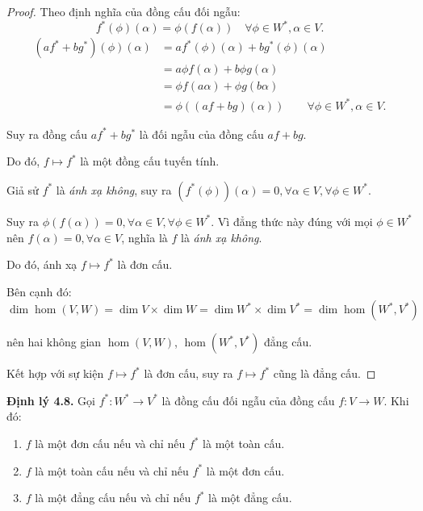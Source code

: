 \documentclass[class=linearalgebra,crop=false]{standalone}
\begin{document}
\begin{proof}
    Theo định nghĩa của đồng cấu đối ngẫu:
    \[
        f^{*}(\phi)(\alpha) = \phi(f(\alpha))\quad\forall\phi\in W^{*},\alpha\in V.
    \]
    \begin{align*}
        (af^{*}+bg^{*})(\phi)(\alpha) & = af^{*}(\phi)(\alpha) + bg^{*}(\phi)(\alpha) \\
                                      & = a\phi f(\alpha) + b\phi g(\alpha) \\
                                      & = \phi f(a\alpha) + \phi g(b\alpha) \\
                                      & = \phi((af + bg)(\alpha))\qquad\forall\phi\in W^{*},\alpha\in V.
    \end{align*}
    \par Suy ra đồng cấu $af^{*} + bg^{*}$ là đối ngẫu của đồng cấu $af + bg$.
    \par Do đó, $f\mapsto f^{*}$ là một đồng cấu tuyến tính.
    \bigskip
    \par Giả sử $f^{*}$ là \textit{ánh xạ không}, suy ra $(f^{*}(\phi))(\alpha) = 0,\forall\alpha\in V,\forall\phi\in W^{*}$.
    \par Suy ra $\phi(f(\alpha)) = 0,\forall\alpha\in V,\forall\phi\in W^{*}$. Vì đẳng thức này đúng với mọi $\phi\in W^{*}$ nên $f(\alpha) = 0,\forall\alpha\in V$, nghĩa là $f$ là \textit{ánh xạ không}.
    \par Do đó, ánh xạ $f\mapsto f^{*}$ là đơn cấu.
    \bigskip
    \par Bên cạnh đó:
    \[
        \dim\hom(V, W) = \dim V\times\dim W = \dim W^{*}\times\dim V^{*} = \dim\hom(W^{*}, V^{*})
    \]
    \par nên hai không gian $\hom(V, W)$, $\hom(W^{*}, V^{*})$ đẳng cấu.
    \par Kết hợp với sự kiện $f\mapsto f^{*}$ là đơn cấu, suy ra $f\mapsto f^{*}$ cũng là đẳng cấu.
\end{proof}

\noindent\textbf{Định lý 4.8.} Gọi $f^{*}: W^{*}\to V^{*}$ là đồng cấu đối ngẫu của đồng cấu $f: V\to W$. Khi đó:
\begin{enumerate}[label = (\arabic*)]
    \item $f$ là một đơn cấu nếu và chỉ nếu $f^{*}$ là một toàn cấu.
    \item $f$ là một toàn cấu nếu và chỉ nếu $f^{*}$ là một đơn cấu.
    \item $f$ là một đẳng cấu nếu và chỉ nếu $f^{*}$ là một đẳng cấu.
\end{enumerate}
\end{document}
